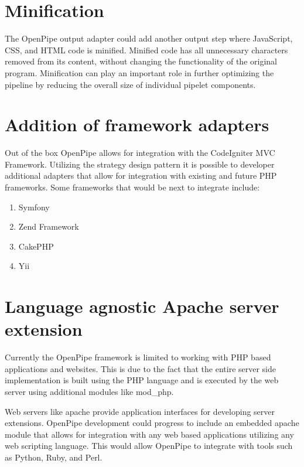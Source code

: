 \documentclass[12pt]{report}
\begin{document}
\section{Minification}
The OpenPipe output adapter could add another output step where JavaScript, CSS, and HTML code is minified. Minified code has all unnecessary characters removed from its content, without changing the functionality of the original program. Minification can play an important role in further optimizing the pipeline by reducing the overall size of individual pipelet components.

\section{Addition of framework adapters}
Out of the box OpenPipe allows for integration with the CodeIgniter MVC Framework. Utilizing the strategy design pattern it is possible to developer additional adapters that allow for integration with existing and future PHP frameworks. Some frameworks that would be next to integrate include:

\begin{enumerate}
	\item Symfony
	\item Zend Framework
	\item CakePHP
	\item Yii
\end{enumerate}

\section{Language agnostic Apache server extension}
Currently the OpenPipe framework is limited to working with PHP based applications and websites. This is due to the fact that the entire server side implementation is built  using the PHP language and is executed by the web server using additional modules like mod\_php. 

Web servers like apache provide application interfaces for developing server extensions. OpenPipe development could progress to include an embedded apache module that allows for integration with any web based applications utilizing any web scripting language. This would allow OpenPipe to integrate with tools such as Python, Ruby, and Perl.




\end{document}
